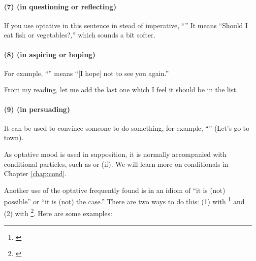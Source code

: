 \paragraph*{(7)  (in questioning or reflecting)} If you use optative in this sentence in stead of imperative, ``'' It means ``Should I eat fish or vegetables?,'' which sounds a bit softer.

\paragraph*{(8)  (in aspiring or hoping)} For example, ``'' means ``[I hope] not to see you again.''

From my reading, let me add the last one which I feel it should be in the list.

\paragraph*{(9)  (in persuading)} It can be used to convince someone to do something, for example, ``'' (Let's go to town).

\bigskip
As optative mood is used in supposition, it is normally accompanied with conditional particles, such as  or  (if). We will learn more on conditionals in Chapter \ref{chap:cond}.

Another use of the optative frequently found is in an idiom of ``it is (not) possible'' or ``it is (not) the case.'' There are two ways to do this: (1) with \footnote{\citealp[p.~387]{perniola:grammar}} and (2) with \footnote{\citealp[p.~63, 73, 88, 333]{warder:intro}}. Here are some examples:

